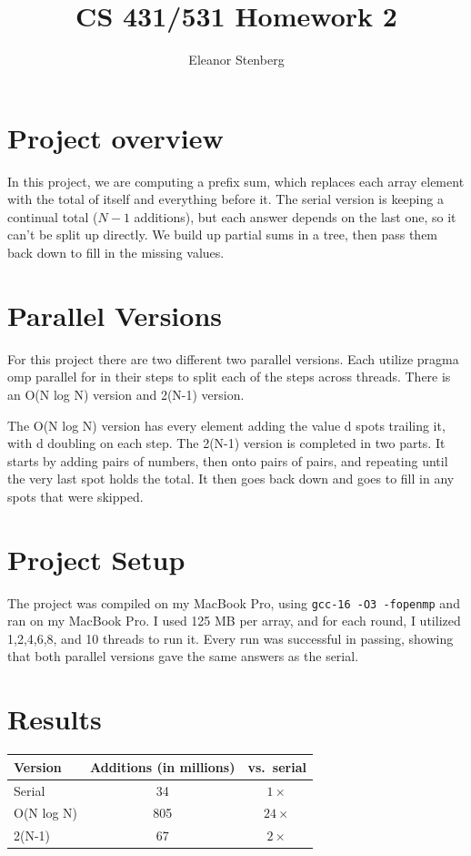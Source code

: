 \documentclass[10pt,twocolumn]{article}
\title{\vspace{-0.4in}CS 431/531 Homework 2}
\author{Eleanor Stenberg}
\date{\vspace{-0.3in}}
\begin{document}
\maketitle

\section{Project overview}
In this project, we are computing a prefix sum, which replaces each array element with the total of itself and everything before it. The serial version is keeping a continual total ($N-1$ additions), but each answer depends on the last one, so it can't be split up directly. We build up partial sums in a tree, then pass them back down to fill in the missing values. 


\section{Parallel Versions}
For this project there are two different two parallel versions. Each utilize pragma omp parallel for in their steps to split each of the steps across threads. There is an O(N log N) version and 2(N-1) version.

The O(N log N) version has every element adding the value d spots trailing it, with d doubling on each step. The 2(N-1) version is completed in two parts. It starts by adding pairs of numbers, then onto pairs of pairs, and repeating until the very last spot holds the total. It then goes back down and goes to fill in any spots that were skipped.


\section{Project Setup}
The project was compiled on my MacBook Pro, using \texttt{gcc-16 -O3 -fopenmp} and ran on my MacBook Pro. I used 125 MB per array, and for each round, I utilized 1,2,4,6,8, and 10 threads to run it. Every run was successful in passing, showing that both parallel versions gave the same answers as the serial. 

\section{Results}

\begin{table}[H]\centering\small
\begin{tabular}{l|c|c}
Version & Additions (in millions) & vs.\ serial \\ \hline
Serial     & 34  & $1\times$  \\
O(N log N) & 805 & $24\times$ \\
2(N-1)     & 67  & $2\times$  \\
\end{tabular}
\end{table}
\end{document}
